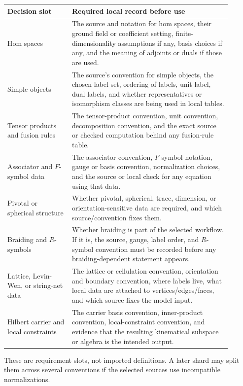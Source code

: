 \begin{center}
\small
\begin{tabular}{p{0.26\linewidth}p{0.64\linewidth}}
\toprule
Decision slot & Required local record before use \\
\midrule
Hom spaces &
The source and notation for hom spaces, their ground field or coefficient
setting, finite-dimensionality assumptions if any, basis choices if any, and
the meaning of adjoints or duals if those are used. \\
\addlinespace
Simple objects &
The source's convention for simple objects, the chosen label set, ordering of
labels, unit label, dual labels, and whether representatives or isomorphism
classes are being used in local tables. \\
\addlinespace
Tensor products and fusion rules &
The tensor-product convention, unit convention, decomposition convention, and
the exact source or checked computation behind any fusion-rule table. \\
\addlinespace
Associator and \(F\)-symbol data &
The associator convention, \(F\)-symbol notation, gauge or basis convention,
normalization choices, and the source or local check for any equation using
that data. \\
\addlinespace
Pivotal or spherical structure &
Whether pivotal, spherical, trace, dimension, or orientation-sensitive data
are required, and which source/convention fixes them. \\
\addlinespace
Braiding and \(R\)-symbols &
Whether braiding is part of the selected workflow.  If it is, the source,
gauge, label order, and \(R\)-symbol convention must be recorded before any
braiding-dependent statement appears. \\
\addlinespace
Lattice, Levin-Wen, or string-net data &
The lattice or cellulation convention, orientation and boundary convention,
where labels live, what local data are attached to vertices/edges/faces, and
which source fixes the model input. \\
\addlinespace
Hilbert carrier and local constraints &
The carrier basis convention, inner-product convention, local-constraint
convention, and evidence that the resulting kinematical subspace or algebra is
the intended output. \\
\bottomrule
\end{tabular}
\end{center}

These are requirement slots, not imported definitions.  A later shard may
split them across several conventions if the selected sources use incompatible
normalizations.

